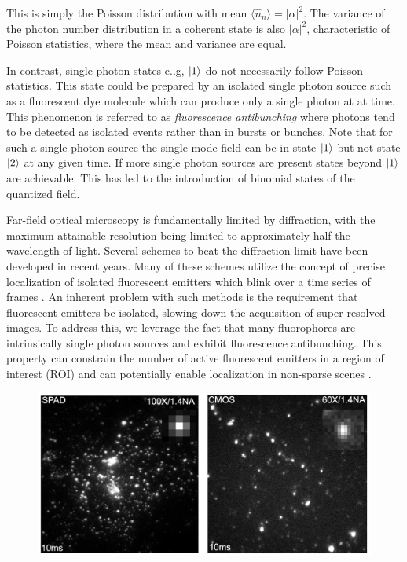 This is simply the Poisson distribution with mean $\langle \hat{n}_n \rangle = \lvert\alpha\lvert^2$. The variance of the photon number distribution in a coherent state is also $\lvert\alpha\lvert^2$, characteristic of Poisson statistics, where the mean and variance are equal. 

In contrast, single photon states e..g, $\ket{1}$ do not necessarily follow Poisson statistics. This state could be prepared by an isolated single photon source such as a fluorescent dye molecule which can produce only a single photon at at time. This phenomenon is referred to as \emph{fluorescence antibunching} where photons tend to be detected as isolated events rather than in bursts or bunches. Note that for such a single photon source the single-mode field can be in state $\ket{1}$ but not state $\ket{2}$ at any given time. If more single photon sources are present states beyond $\ket{1}$ are achievable. This has led to the introduction of binomial states of the quantized field.


Far-field optical microscopy is fundamentally limited by diffraction, with the maximum attainable resolution being limited to approximately half the wavelength of light. Several schemes to beat the diffraction limit have been developed in recent years. Many of these schemes utilize the concept of precise localization of isolated fluorescent emitters which blink over a time series of frames \parencite{Rust2006,Betzig2006}. An inherent problem with such methods is the requirement that fluorescent emitters be isolated, slowing down the acquisition of super-resolved images. To address this, we leverage the fact that many fluorophores are intrinsically single photon sources and exhibit fluorescence antibunching. This property can constrain the number of active fluorescent emitters in a region of interest (ROI) and can potentially enable localization in non-sparse scenes \parencite{Ta2010,Israel2017}. 

\begin{figure}[t]
\centering
\includegraphics[width=14cm]{media/SPADvCMOS.png}
\caption{}
\end{figure}    

